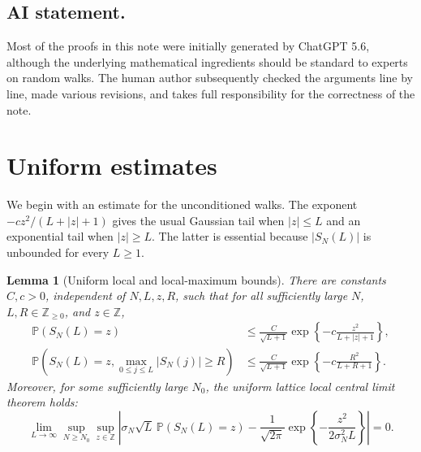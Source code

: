 \documentclass[11pt]{article}
\theoremstyle{plain}
\newtheorem{lemma}{Lemma}[section]
\theoremstyle{definition}
\theoremstyle{remark}
\newcommand{\Z}{\mathbb Z}
\newcommand{\Pp}{\mathbb P}
\begin{document}
\subsection*{AI statement.} Most of the proofs in this note were
initially generated by ChatGPT 5.6, although the underlying mathematical
ingredients should be standard to experts on random walks. The human author
subsequently checked the arguments line by line, made various revisions, and
takes full responsibility for the correctness of the note.

\section{Uniform estimates}

We begin with an estimate for the unconditioned walks. The exponent
\(-cz^2/(L+|z|+1)\) gives the usual Gaussian tail when \(|z|\le L\) and an
exponential tail when \(|z|\ge L\). The latter is essential because
\(|S_N(L)|\) is unbounded for every \(L\ge1\).

\begin{lemma}[Uniform local and local-maximum bounds]
\label{lem:unconditioned}
There are constants \(C,c>0\), independent of \(N,L,z,R\), such that
for all sufficiently large \(N\), \(L,R\in\Z_{\ge0}\), and \(z\in\Z\),
\begin{align}
 \Pp(S_N(L)=z)
 &\le \frac{C}{\sqrt{L+1}}
 \exp\left\{-c\frac{z^2}{L+|z|+1}\right\},       \label{eq:local-bernstein}\\
 \Pp\left(S_N(L)=z,
       \max_{0\le j\le L}|S_N(j)|\ge R\right)
 &\le \frac{C}{\sqrt{L+1}}
 \exp\left\{-c\frac{R^2}{L+R+1}\right\}.         \label{eq:local-max}
\end{align}
Moreover, for some sufficiently large \(N_0\), the uniform lattice
local central limit theorem holds:
\begin{equation}
 \lim_{L\to\infty}\sup_{N\ge N_0}\sup_{z\in\Z}
 \left|
 \sigma_N\sqrt L\,\Pp(S_N(L)=z)
 -\frac1{\sqrt{2\pi}}
  \exp\left\{-\frac{z^2}{2\sigma_N^2L}\right\}
 \right|=0.
 \label{eq:uniform-local-clt}
\end{equation}
\end{lemma}
\end{document}
